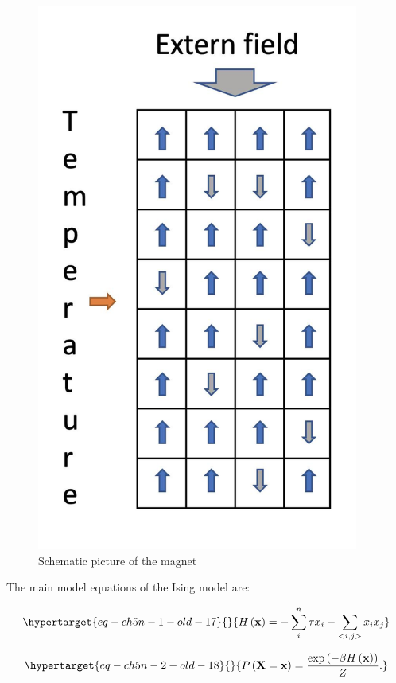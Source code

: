 \documentclass[
  a4paper,
  DIV=11,
  numbers=noendperiod,
  oneside]{scrreprt}
\begin{document}
\begin{figure}

{\centering \includegraphics[width=4.16667in,height=\textheight]{media/ch5n/image1.jpg}

}

\caption{\label{fig-ch5n-img1-old-39}Schematic picture of the magnet}

\end{figure}

The main model equations of the Ising model are:

\begin{equation}\protect\hypertarget{eq-ch5n-1-old-17}{}{
H\left( \mathbf{x} \right) = - \sum_{i}^{n}{\tau x_{i}} - \sum_{< i,j >}^{}{x_{i}x_{j}}}\label{eq-ch5n-1-old-17}\end{equation}

\begin{equation}\protect\hypertarget{eq-ch5n-2-old-18}{}{
P\left( \mathbf{X} = \mathbf{x} \right) = \frac{\exp\left( - \beta H\left( \mathbf{x} \right) \right)}{Z}.}\label{eq-ch5n-2-old-18}\end{equation}
\end{document}
